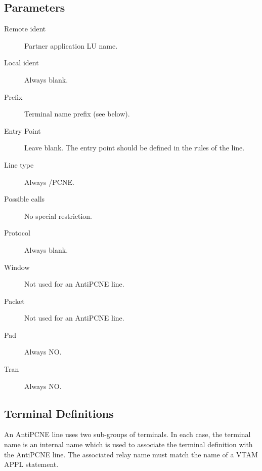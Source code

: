 \documentclass[letterpaper,10pt,english]{sphinxmanual}
\begin{document}


\subsection{Parameters}
\label{\detokenize{connectivity_guide:index-83}}\label{\detokenize{connectivity_guide:id40}}\begin{description}
\item[{Remote ident}] \leavevmode
Partner application LU name.

\item[{Local ident}] \leavevmode
Always blank.

\item[{Prefix}] \leavevmode
Terminal name prefix (see below).

\item[{Entry Point}] \leavevmode
Leave blank. The entry point should be defined in the rules of the line.

\item[{Line type}] \leavevmode
Always /PCNE.

\item[{Possible calls}] \leavevmode
No special restriction.

\item[{Protocol}] \leavevmode
Always blank.

\item[{Window}] \leavevmode
Not used for an AntiPCNE line.

\item[{Packet}] \leavevmode
Not used for an AntiPCNE line.

\item[{Pad}] \leavevmode
Always NO.

\item[{Tran}] \leavevmode
Always NO.

\end{description}


\subsection{Terminal Definitions}
\label{\detokenize{connectivity_guide:index-84}}\label{\detokenize{connectivity_guide:id41}}
An AntiPCNE line uses two sub-groups of terminals. In each case, the terminal name is an internal name which is used to associate the terminal definition with the AntiPCNE line. The associated relay name must match the name of a VTAM APPL statement.
\end{document}
